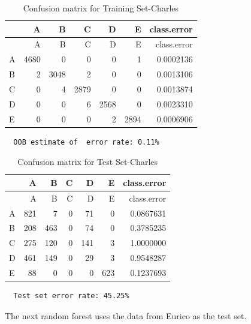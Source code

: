 \documentclass[12pt,twoside]{reedthesis}
\begin{document}
  \begin{longtable}[c]{@{}lrrrrrr@{}}
  \caption{Confusion matrix for Training Set-Charles}\tabularnewline
  \toprule
  & A & B & C & D & E & class.error\tabularnewline
  \midrule
  \endfirsthead
  \toprule
  & A & B & C & D & E & class.error\tabularnewline
  \midrule
  \endhead
  A & 4680 & 0 & 0 & 0 & 1 & 0.0002136\tabularnewline
  B & 2 & 3048 & 2 & 0 & 0 & 0.0013106\tabularnewline
  C & 0 & 4 & 2879 & 0 & 0 & 0.0013874\tabularnewline
  D & 0 & 0 & 6 & 2568 & 0 & 0.0023310\tabularnewline
  E & 0 & 0 & 0 & 2 & 2894 & 0.0006906\tabularnewline
  \bottomrule
  \end{longtable}
  
  \begin{verbatim}
  OOB estimate of  error rate: 0.11%
  \end{verbatim}
  
  \newpage
  
  \begin{longtable}[c]{@{}lrrrrrr@{}}
  \caption{Confusion matrix for Test Set-Charles}\tabularnewline
  \toprule
  & A & B & C & D & E & class.error\tabularnewline
  \midrule
  \endfirsthead
  \toprule
  & A & B & C & D & E & class.error\tabularnewline
  \midrule
  \endhead
  A & 821 & 7 & 0 & 71 & 0 & 0.0867631\tabularnewline
  B & 208 & 463 & 0 & 74 & 0 & 0.3785235\tabularnewline
  C & 275 & 120 & 0 & 141 & 3 & 1.0000000\tabularnewline
  D & 461 & 149 & 0 & 29 & 3 & 0.9548287\tabularnewline
  E & 88 & 0 & 0 & 0 & 623 & 0.1237693\tabularnewline
  \bottomrule
  \end{longtable}
  
  \begin{verbatim}
  Test set error rate: 45.25%
  \end{verbatim}
  
  The next random forest uses the data from Eurico as the test set.
  
  \begin{Shaded}
  \begin{Highlighting}[]
  \NormalTok{(}\NormalTok{)}
  
  \StringTok{ }\NormalTok{wl2[wl2$user_name ==}\StringTok{ }\NormalTok{subjects[}\NormalTok{], ]}
  \StringTok{ }\NormalTok{wl2[wl2$user_name !=}\StringTok{ }\NormalTok{subjects[}\NormalTok{], ]}
  \StringTok{ }\NormalTok{(} \NormalTok{OtherSubs4[, }\NormalTok{:}\NormalTok{], } 
                                  \NormalTok{Sub4[, }\NormalTok{:}\NormalTok{], }
                                  
                                  \NormalTok{)}
  \end{Highlighting}
  \end{Shaded}
  
\end{document}
